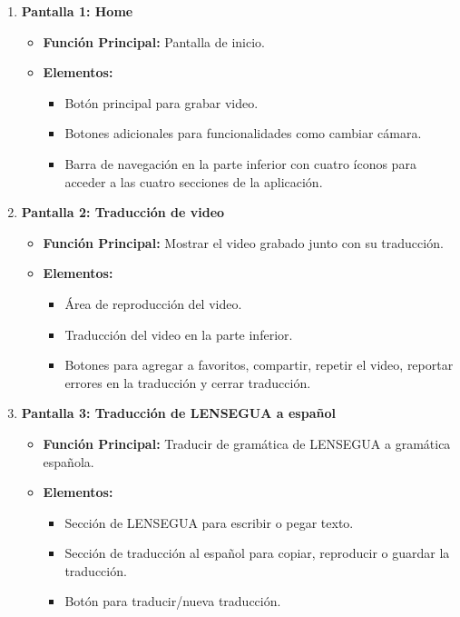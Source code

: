 \begin{enumerate}
    \item \textbf{Pantalla 1: Home}
    \begin{itemize}
        \item \textbf{Función Principal:} Pantalla de inicio.
        \item \textbf{Elementos:}
        \begin{itemize}
            \item Botón principal para grabar video.
            \item Botones adicionales para funcionalidades como cambiar cámara.
            \item Barra de navegación en la parte inferior con cuatro íconos para acceder a las cuatro secciones de la aplicación.
        \end{itemize}
    \end{itemize}

    \item \textbf{Pantalla 2: Traducción de video}
    \begin{itemize}
        \item \textbf{Función Principal:} Mostrar el video grabado junto con su traducción.
        \item \textbf{Elementos:}
        \begin{itemize}
            \item Área de reproducción del video.
            \item Traducción del video en la parte inferior.
            \item Botones para agregar a favoritos, compartir, repetir el video, reportar errores en la traducción y cerrar traducción.
        \end{itemize}
    \end{itemize}

    \item \textbf{Pantalla 3: Traducción de LENSEGUA a español}
    \begin{itemize}
        \item \textbf{Función Principal:} Traducir de gramática de LENSEGUA a gramática española.
        \item \textbf{Elementos:}
        \begin{itemize}
            \item Sección de LENSEGUA para escribir o pegar texto.
            \item Sección de traducción al español para copiar, reproducir o guardar la traducción.
            \item Botón para traducir/nueva traducción.
        \end{itemize}
    \end{itemize}


\end{enumerate}
